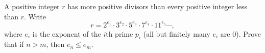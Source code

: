 A positive integer $r$ has more positive divisors than every positive integer less than $r$. Write
\[r=2^{e_1}\cdot3^{e_2}\cdot5^{e_3}\cdot7^{e_4}\cdot11^{e_5}\cdots,\]
where $e_i$ is the exponent of the $i$th prime $p_i$ (all but finitely many $e_i$ are $0$). Prove that if $n>m$, then $e_n\le e_m$.
